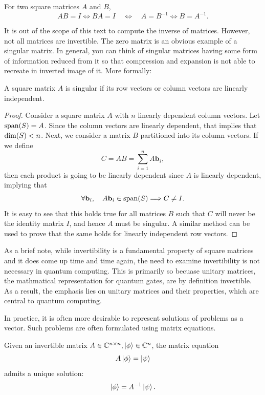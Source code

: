 \documentclass[12pt]{article}
\begin{document}
\begin{theorem}
    For two square matrices $A$ and $B$, 
    $$AB = I \Leftrightarrow BA = I \quad \Longleftrightarrow \quad A = B^{-1} \Leftrightarrow B = A^{-1}.$$
\end{theorem}

It is out of the scope of this text to compute the inverse of matrices. However, not all matrices are invertible. The zero matrix is an obvious example of a singular matrix. In general, you can think of singular matrices having some form of information reduced from it so that compression and expansion is not able to recreate in inverted image of it. More formally: 

\begin{theorem}
    A square matrix $A$ is singular if its row vectors or column vectors are linearly independent. 
\end{theorem}

\begin{proof}
    Consider a square matrix $A$ with $n$ linearly dependent column vectors. Let $\operatorname{span}(S) = A$. Since the column vectors are linearly dependent, that implies that $\operatorname{dim}(S) < n$. Next, we consider a matrix $B$ partitioned into its column vectors. If we define 
    $$C = AB = \sum_{i=1}^{n} A \mathbf{b}_i,$$
    then each product is going to be linearly dependent since $A$ is linearly dependent, implying that 
    $$\forall \mathbf{b}_i, \quad A \mathbf{b}_i \in \operatorname{span}(S) \Longrightarrow C \neq I.$$
    It is easy to see that this holds true for all matrices $B$ such that $C$ will never be the identity matrix $I$, and hence $A$ must be singular. A similar method can be used to prove that the same holds for linearly independent row vectors. 
\end{proof}

As a brief note, while invertibility is a fundamental property of square matrices and it does come up time and time again, the need to examine invertibility is not necessary in quantum computing. This is primarily so becuase unitary matrices, the mathmatical representation for quantum gates, are by definition invertible. As a result, the emphasis lies on unitary matrices and their properties, which are central to quantum computing. 

In practice, it is often more desirable to represent solutions of problems as a vector. Such problems are often formulated using matrix equations. 

\begin{theorem}
    Given an invertible matrix $A \in \mathbb{C}^{n \times n}, \ket{\phi} \in \mathbb{C}^n$, the matrix equation
    $$A \ket{\phi} = \ket{\psi}$$
    admits a unique solution:
    $$\ket{\phi} = A^{-1} \ket{\psi}.$$
\end{theorem}
\end{document}
